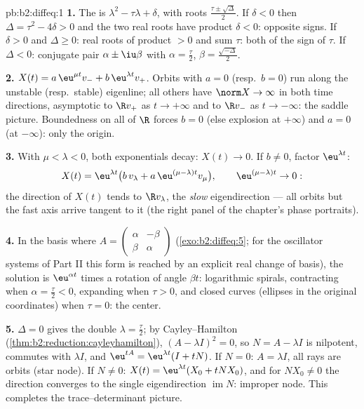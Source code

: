 \begin{solution}{pb:b2:diffeq:1}
\textbf{1.} The  is $\lambda^2 -
\tau\lambda + \delta$, with roots
$\frac{\tau\pm\sqrt\Delta}{2}$. If $\delta < 0$ then $\Delta =
\tau^2 - 4\delta > 0$ and the two real roots have product
$\delta < 0$: opposite signs. If $\delta > 0$ and $\Delta \geq
0$: real roots of product $> 0$ and sum $\tau$: both of the
sign of $\tau$. If $\Delta < 0$: conjugate pair $\alpha \pm
\iu\beta$ with $\alpha = \frac\tau2$, $\beta =
\frac{\sqrt{-\Delta}}2$.

\textbf{2.} $X(t) = a\,\eu^{\mu t}v_- + b\,\eu^{\lambda t}v_+$.
Orbits with $a = 0$ (resp.\ $b = 0$) run along the unstable
(resp.\ stable) eigenline; all others have $\norm X \to \infty$
in both time directions, asymptotic to $\R v_+$ as $t \to
+\infty$ and to $\R v_-$ as $t \to -\infty$: the saddle
picture. Boundedness on all of $\R$ forces $b = 0$ (else
explosion at $+\infty$) and $a = 0$ (at $-\infty$): only the
origin.

\textbf{3.} With $\mu < \lambda < 0$, both exponentials decay:
$X(t) \to 0$. If $b \neq 0$, factor $\eu^{\lambda t}$:
\[
X(t) = \eu^{\lambda t}\bigl(b\,v_\lambda + a\,\eu^{(\mu -
\lambda)t}v_\mu\bigr),
\qquad \eu^{(\mu-\lambda)t} \to 0 :
\]
the direction of $X(t)$ tends to $\R v_\lambda$, the
\emph{slow} eigendirection --- all orbits but the fast axis
arrive tangent to it (the right panel of the chapter's phase
portraits).

\textbf{4.} In the basis where $A = \begin{pmatrix} \alpha &
-\beta\\ \beta & \alpha\end{pmatrix}$
(\cref{exo:b2:diffeq:5}; for the oscillator systems of Part II
this form is reached by an explicit real change of basis), the
solution is $\eu^{\alpha t}$ times a rotation of angle $\beta
t$: logarithmic spirals, contracting when $\alpha = \frac\tau2
< 0$, expanding when $\tau > 0$, and closed curves (ellipses
in the original coordinates) when $\tau = 0$: the center.

\textbf{5.} $\Delta = 0$ gives the double  $\lambda =
\frac\tau2$; by Cayley--Hamilton
(\cref{thm:b2:reduction:cayleyhamilton}), $(A - \lambda I)^2 =
0$, so $N = A - \lambda I$ is nilpotent, commutes with
$\lambda I$, and $\eu^{tA} = \eu^{\lambda t}(I + tN)$. If $N =
0$: $A = \lambda I$, all rays are orbits (star node). If $N
\neq 0$: $X(t) = \eu^{\lambda t}(X_0 + tNX_0)$, and for $NX_0
\neq 0$ the direction converges to the single eigendirection
$\operatorname{im}N$: improper node. This completes the
trace--determinant picture.


\end{solution}
